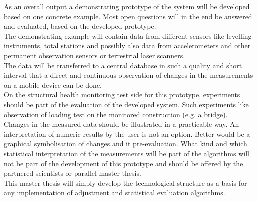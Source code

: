 As an overall output a demonstrating prototype of the system will be developed based on one concrete example. Most open questions will in the end be answered and evaluated, based on the developed prototype.\\
The demonstrating example will contain data from different sensors like levelling instruments, total stations and possibly also data from accelerometers and other permanent observation sensors or terrestrial laser scanners.\\
The data will be transferred to a central database in such a quality and short interval that a direct and continuous observation of changes in the measurements on a mobile device can be done.\\
On the structural health monitoring test side for this prototype, experiments should be part of the evaluation of the developed system. Such experiments like observation of loading test on the monitored construction (e.g. a bridge). \\
Changes in the measured data should be illustrated in a practicable way. An interpretation of numeric results by the user is not an option. Better would be a graphical symbolisation of changes and it pre-evaluation. What kind and which statistical interpretation of the measurements will be part of the algorithms will not be part of the development of this prototype and should be offered by the partnered scientists or parallel master thesis.\\
This master thesis will simply develop the technological structure as a basis for any implementation of adjustment and statistical evaluation algorithms.\\
